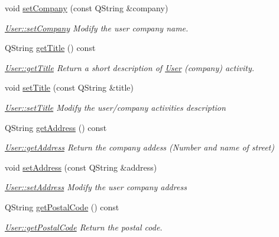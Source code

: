 \begin{DoxyCompactItemize}
void \hyperlink{classModels_1_1User_ab51a6e7ea016ad3c7d18c754582edd53}{set\-Company} (const Q\-String \&company)
\begin{DoxyCompactList}\small\item\em \hyperlink{classModels_1_1User_ab51a6e7ea016ad3c7d18c754582edd53}{User\-::set\-Company} Modify the user {\itshape company} name. \end{DoxyCompactList}\item 
Q\-String \hyperlink{classModels_1_1User_a56a37a1b1125c28e8e72c9a3551b7da5}{get\-Title} () const 
\begin{DoxyCompactList}\small\item\em \hyperlink{classModels_1_1User_a56a37a1b1125c28e8e72c9a3551b7da5}{User\-::get\-Title} Return a short description of \hyperlink{classModels_1_1User}{User} (company) activity. \end{DoxyCompactList}\item 
void \hyperlink{classModels_1_1User_a0fe65ebdee17c2986c874e480e1cb0bd}{set\-Title} (const Q\-String \&title)
\begin{DoxyCompactList}\small\item\em \hyperlink{classModels_1_1User_a0fe65ebdee17c2986c874e480e1cb0bd}{User\-::set\-Title} Modify the user/company activities {\itshape description} \end{DoxyCompactList}\item 
Q\-String \hyperlink{classModels_1_1User_afef76dde9b2e3fdb3c2fef33c2dc0d4d}{get\-Address} () const 
\begin{DoxyCompactList}\small\item\em \hyperlink{classModels_1_1User_afef76dde9b2e3fdb3c2fef33c2dc0d4d}{User\-::get\-Address} Return the company addess (Number and name of street) \end{DoxyCompactList}\item 
void \hyperlink{classModels_1_1User_a2a6098ed13472398a972944b88905ebd}{set\-Address} (const Q\-String \&address)
\begin{DoxyCompactList}\small\item\em \hyperlink{classModels_1_1User_a2a6098ed13472398a972944b88905ebd}{User\-::set\-Address} Modify the user company {\itshape address} \end{DoxyCompactList}\item 
Q\-String \hyperlink{classModels_1_1User_a4d6dae7e681b0acc7bbd1c4cc7b84062}{get\-Postal\-Code} () const 
\begin{DoxyCompactList}\small\item\em \hyperlink{classModels_1_1User_a4d6dae7e681b0acc7bbd1c4cc7b84062}{User\-::get\-Postal\-Code} Return the postal code. \end{DoxyCompactList}\item 

\end{DoxyCompactItemize}
